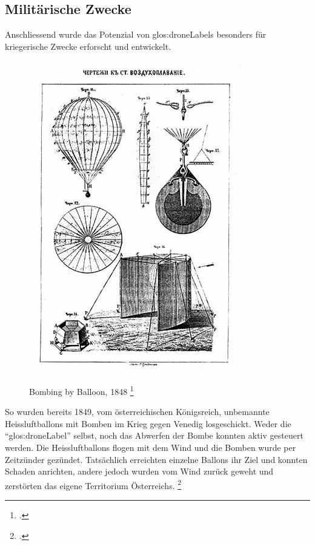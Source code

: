 \subsection{Militärische Zwecke}
Anschliessend wurde das Potenzial von \glspl{glos:droneLabel} besonders für kriegerische Zwecke erforscht und entwickelt.

\begin{figure}
	\includegraphics[width=1.0\linewidth]{images/analysis/balloonbombs1849.jpg}
 	\caption[Bombing by Balloon, 1848]{Bombing by Balloon, 1848 \protect\footcite{Remote_Piloted_Aerial_Vehicles_2015-03-21}}
\end{figure}

So wurden bereits 1849, vom österreichischen Königsreich, unbemannte Heissluftballons mit Bomben im Krieg gegen Venedig losgeschickt.
Weder die "`\gls{glos:droneLabel}"' selbst, noch das Abwerfen der Bombe konnten aktiv gesteuert werden.
Die Heissluftballons flogen mit dem Wind und die Bomben wurde per Zeitzünder gezündet. Tatsächlich erreichten einzelne Ballons ihr Ziel und konnten Schaden anrichten, andere jedoch wurden vom Wind zurück geweht und zerstörten das eigene Territorium Österreichs. \footcite{Remote_Piloted_Aerial_Vehicles_2015-03-21}


